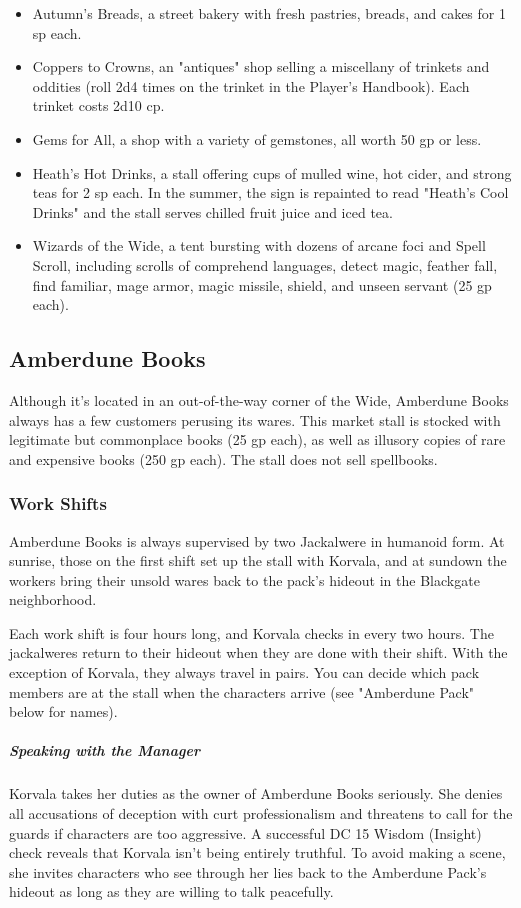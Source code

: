 \documentclass[10pt,a4paper,twoside,bg=print,twocolumn,openany,nodeprecatedcode]{dndbook}
\begin{document}
\begin{itemize}
\item Autumn's Breads, a street bakery with fresh pastries, breads, and cakes for 1 sp each.
\item Coppers to Crowns, an "antiques" shop selling a miscellany of trinkets and oddities (roll 2d4 times on the trinket in the Player's Handbook). Each trinket costs 2d10 cp.
\item Gems for All, a shop with a variety of gemstones, all worth 50 gp or less.
\item Heath's Hot Drinks, a stall offering cups of mulled wine, hot cider, and strong teas for 2 sp each. In the summer, the sign is repainted to read "Heath's Cool Drinks" and the stall serves chilled fruit juice and iced tea.
\item Wizards of the Wide, a tent bursting with dozens of arcane foci and Spell Scroll, including scrolls of comprehend languages, detect magic, feather fall, find familiar, mage armor, magic missile, shield, and unseen servant (25 gp each).
\end{itemize}

\subsection{Amberdune Books}
Although it's located in an out-of-the-way corner of the Wide, Amberdune Books always has a few customers perusing its wares. This market stall is stocked with legitimate but commonplace books (25 gp each), as well as illusory copies of rare and expensive books (250 gp each). The stall does not sell spellbooks.

\subsubsection{Work Shifts}
Amberdune Books is always supervised by two Jackalwere in humanoid form. At sunrise, those on the first shift set up the stall with Korvala, and at sundown the workers bring their unsold wares back to the pack's hideout in the Blackgate neighborhood.

Each work shift is four hours long, and Korvala checks in every two hours. The jackalweres return to their hideout when they are done with their shift. With the exception of Korvala, they always travel in pairs. You can decide which pack members are at the stall when the characters arrive (see "Amberdune Pack" below for names).

\subparagraph{Speaking with the Manager}
Korvala takes her duties as the owner of Amberdune Books seriously. She denies all accusations of deception with curt professionalism and threatens to call for the guards if characters are too aggressive. A successful DC 15 Wisdom (Insight) check reveals that Korvala isn't being entirely truthful. To avoid making a scene, she invites characters who see through her lies back to the Amberdune Pack's hideout as long as they are willing to talk peacefully.
\end{document}
